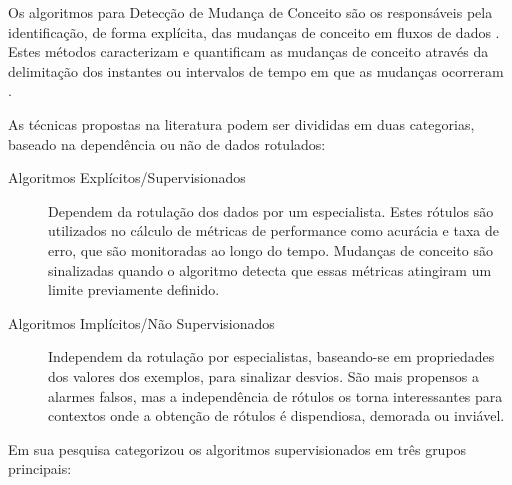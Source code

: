 \documentclass[qual, classic, a4paper]{ufbathesis}
\begin{document}
Os algoritmos para Detecção de Mudança de Conceito são os responsáveis pela identificação, de forma explícita, das mudanças de conceito em fluxos de dados \cite{Gama:2014:SCD:2597757.2523813}.
Estes métodos caracterizam e quantificam as mudanças de conceito através da delimitação dos instantes ou intervalos de tempo em que as mudanças ocorreram \cite{Basseville:1993:DAC:151741}.

As técnicas propostas na literatura podem ser divididas em duas categorias, baseado na dependência ou não de dados rotulados:
\begin{description}
    \item[Algoritmos Explícitos/Supervisionados] Dependem da rotulação dos dados por um especialista.
    Estes rótulos são utilizados no cálculo de métricas de performance como acurácia e taxa de erro, que são monitoradas ao longo do tempo.
    Mudanças de conceito são sinalizadas quando o algoritmo detecta que essas métricas atingiram um limite previamente definido.

    \item[Algoritmos Implícitos/Não Supervisionados] Independem da rotulação por especialistas, 
    baseando-se em propriedades dos valores dos exemplos, para sinalizar desvios.
    São mais propensos a alarmes falsos, mas a independência de rótulos os torna interessantes para contextos onde a obtenção de rótulos é dispendiosa, demorada ou inviável.
\end{description}

Em sua pesquisa \cite{Gama:2014:SCD:2597757.2523813} categorizou os algoritmos supervisionados em três grupos principais:
\end{document}
